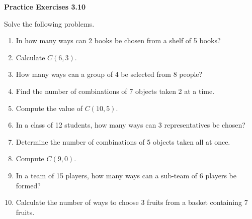 \vspace{0.3ex}
\noindent\textbf{Practice Exercises 3.10}

\vspace{0.2ex}

Solve the following problems. 

\begin{enumerate}[label=\color{blue}\arabic*.]
    \item In how many ways can 2 books be chosen from a shelf of 5 books?
    \item Calculate \(C(6, 3)\).
    \item How many ways can a group of 4 be selected from 8 people?
    \item Find the number of combinations of 7 objects taken 2 at a time.
    \item Compute the value of \(C(10, 5)\).
    \item In a class of 12 students, how many ways can 3 representatives be chosen?
    \item Determine the number of combinations of 5 objects taken all at once.
    \item Compute \(C(9, 0)\).
    \item In a team of 15 players, how many ways can a sub-team of 6 players be formed?
    \item Calculate the number of ways to choose 3 fruits from a basket containing 7 fruits.
\end{enumerate}

